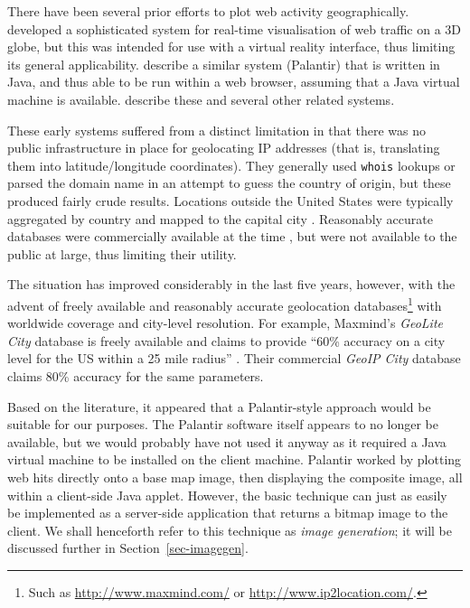 \documentclass[acmtocl,acmnow]{acmtrans2m}
\begin{document}
There have been several prior efforts to plot web activity
geographically.  developed a sophisticated
system for real-time visualisation of web traffic on a 3D globe, but
this was intended for use with a virtual reality interface, thus
limiting its general applicability. 
describe a similar system (Palantir) that is written in Java, and thus
able to be run within a web browser, assuming that a Java virtual
machine is available. 
describe these and several other related systems.

These early systems suffered from a distinct limitation in that there
was no public infrastructure in place for geolocating IP addresses (that
is, translating them into latitude/longitude coordinates). They
generally used \texttt{whois} lookups or parsed the domain name in an
attempt to guess the country of origin, but these produced fairly crude
results. Locations outside the United States were typically aggregated
by country and mapped to the capital city
\cite{Lamm-SE-1996-webvis,Papa-N-1998-Palantir,Jian-B-2000-cybermap}.
Reasonably accurate databases were commercially available at the time
\cite[p.\ 1466]{Lamm-SE-1996-webvis}, but were not available to the
public at large, thus limiting their utility.

The situation has improved considerably in the last five years, however,
with the advent of freely available and reasonably accurate geolocation
databases\footnote{Such as \url{http://www.maxmind.com/} or
\url{http://www.ip2location.com/}.} with worldwide coverage and
city-level resolution. For example, Maxmind's \emph{GeoLite City}
database is freely available and claims to provide ``60\% accuracy on a
city level for the US within a 25 mile radius''
\cite{Maxm-G-2006-GeoLiteCity}. Their commercial \emph{GeoIP City}
database claims 80\% accuracy for the same parameters.

Based on the literature, it appeared that a Palantir-style approach
would be suitable for our purposes. The Palantir software itself appears
to no longer be available, but we would probably have not used it anyway
as it required a Java virtual machine to be installed on the client
machine. Palantir worked by plotting web hits directly onto a base map
image, then displaying the composite image, all within a client-side
Java applet. However, the basic technique can just as easily be
implemented as a server-side application that returns a bitmap image to
the client. We shall henceforth refer to this technique as \emph{image
generation}; it will be discussed further in Section~\ref{sec-imagegen}.
\end{document}
